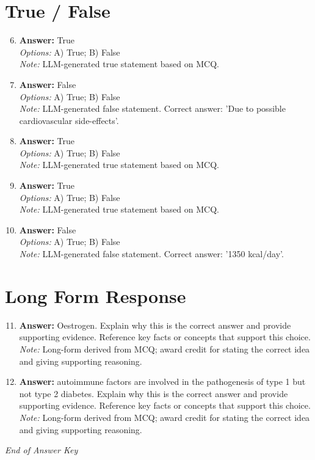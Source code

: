 \documentclass[12pt]{article}
\begin{document}
\section*{True / False}
\begin{enumerate}[label=\arabic*.]
\setcounter{enumi}{5}
\item \textbf{Answer:} True
\\ \textit{Options:} A) True; B) False
\\ \textit{Note:} LLM-generated true statement based on MCQ.
\item \textbf{Answer:} False
\\ \textit{Options:} A) True; B) False
\\ \textit{Note:} LLM-generated false statement. Correct answer: 'Due to possible cardiovascular side-effects'.
\item \textbf{Answer:} True
\\ \textit{Options:} A) True; B) False
\\ \textit{Note:} LLM-generated true statement based on MCQ.
\item \textbf{Answer:} True
\\ \textit{Options:} A) True; B) False
\\ \textit{Note:} LLM-generated true statement based on MCQ.
\item \textbf{Answer:} False
\\ \textit{Options:} A) True; B) False
\\ \textit{Note:} LLM-generated false statement. Correct answer: '1350 kcal/day'.
\end{enumerate}

\section*{Long Form Response}
\begin{enumerate}[label=\arabic*.]
\setcounter{enumi}{10}
\item \textbf{Answer:} Oestrogen. Explain why this is the correct answer and provide supporting evidence. Reference key facts or concepts that support this choice.
\\ \textit{Note:} Long-form derived from MCQ; award credit for stating the correct idea and giving supporting reasoning.
\item \textbf{Answer:} autoimmune factors are involved in the pathogenesis of type 1 but not type 2 diabetes. Explain why this is the correct answer and provide supporting evidence. Reference key facts or concepts that support this choice.
\\ \textit{Note:} Long-form derived from MCQ; award credit for stating the correct idea and giving supporting reasoning.
\end{enumerate}

\vfill
\noindent\textit{End of Answer Key}
\end{document}
